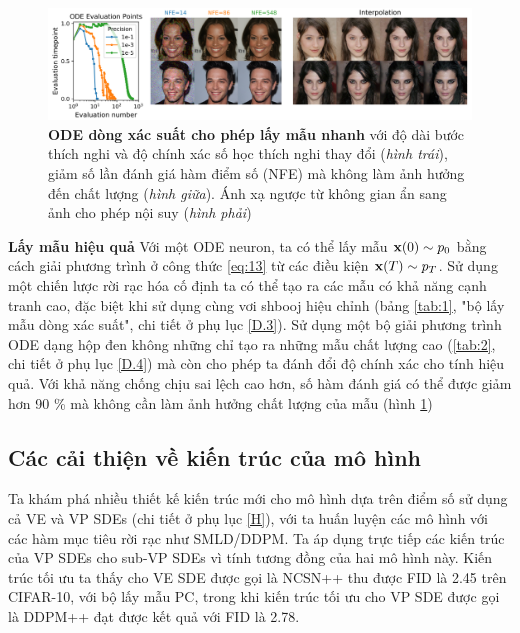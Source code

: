 \documentclass{article} %
\begin{document}
\begin{figure}[h!]
    \centering
    \includegraphics[width=0.9\linewidth]{figures/3.png}
    \caption{\textbf{ODE dòng xác suất cho phép lấy mẫu nhanh} với độ dài bước thích nghi và độ chính xác số học thích nghi thay đổi (\textit{hình trái}), giảm số lần đánh giá hàm điểm số (NFE) mà không làm ảnh hưởng đến chất lượng (\textit{hình giữa}).
    Ánh xạ ngược từ không gian ẩn sang ảnh cho phép nội suy (\textit{hình phải})}
    \label{fig:3}
\end{figure}

\textbf{Lấy mẫu hiệu quả} Với một ODE neuron, ta có thể lấy mẫu $\bold{x}(0) \sim p_0$ bằng cách giải phương trình ở công thức \ref{eq:13} từ các điều kiện $\bold{x}(T) \sim p_T$.
Sử dụng một chiến lược rời rạc hóa cố định ta có thể tạo ra các mẫu có khả năng cạnh tranh cao, đặc biệt khi sử dụng cùng vơi shbooj hiệu chỉnh (bảng \ref{tab:1}, "bộ lấy mẫu dòng xác suất", chi tiết ở phụ lục \ref{D.3}).
Sử dụng một bộ giải phương trình ODE dạng hộp đen \citep{dormand1980family} không những chỉ tạo ra những mẫu chất lượng cao (\ref{tab:2}, chi tiết ở phụ lục \ref{D.4}) mà còn cho phép ta đánh đổi độ chính xác cho tính hiệu quả.
Với khả năng chống chịu sai lệch cao hơn, số hàm đánh giá có thể được giảm hơn 90 \% mà không cần làm ảnh hưởng chất lượng của mẫu (hình \ref{fig:3})

\subsection{Các cải thiện về kiến trúc của mô hình}

Ta khám phá nhiều thiết kế kiến trúc mới cho mô hình dựa trên điểm số sử dụng cả VE và VP SDEs (chi tiết ở phụ lục \ref{H}), với ta huấn luyện các mô hình với các hàm mục tiêu rời rạc như SMLD/DDPM.
Ta áp dụng trực tiếp các kiến trúc của VP SDEs cho sub-VP SDEs vì tính tương đồng của hai mô hình này.
Kiến trúc tối ưu ta thấy cho VE SDE được gọi là NCSN++ thu được FID là 2.45 trên CIFAR-10, với bộ lấy mẫu PC, trong khi kiến trúc tối ưu cho VP SDE được gọi là DDPM++ đạt được kết quả với FID là 2.78.
\end{document}
